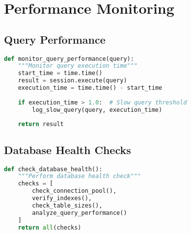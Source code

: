 \section{Performance Monitoring}

\subsection{Query Performance}
\begin{lstlisting}[language=Python]
def monitor_query_performance(query):
    """Monitor query execution time"""
    start_time = time.time()
    result = session.execute(query)
    execution_time = time.time() - start_time
    
    if execution_time > 1.0:  # Slow query threshold
        log_slow_query(query, execution_time)
    
    return result
\end{lstlisting}

\subsection{Database Health Checks}
\begin{lstlisting}[language=Python]
def check_database_health():
    """Perform database health check"""
    checks = [
        check_connection_pool(),
        verify_indexes(),
        check_table_sizes(),
        analyze_query_performance()
    ]
    return all(checks)
\end{lstlisting}